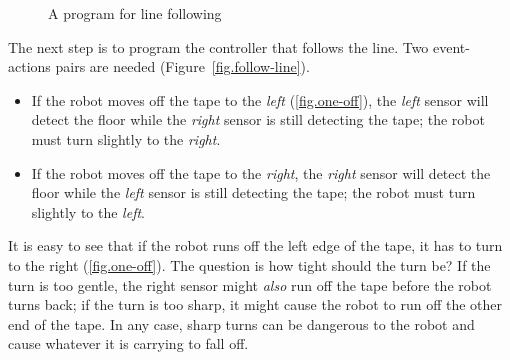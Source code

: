 \begin{figure}
\hfill
{}
\caption{A program for line following}\label{fig.follow-line-all}
\end{figure}




The next step is to program the controller that follows the line. Two
event-actions pairs are needed (Figure~\cref{fig.follow-line}).

\begin{itemize}

\item If the robot moves off the tape to the \emph{left}
(\cref{fig.one-off}), the \emph{left} sensor will detect the floor while
the \emph{right} sensor is still detecting the tape; the robot must
turn slightly to the \emph{right}.

\item If the robot moves off the tape to the \emph{right}, the
\emph{right} sensor will detect the floor while the \emph{left} sensor
is still detecting the tape; the robot must turn slightly
to the \emph{left}.

\end{itemize}



It is easy to see that if the robot runs off the left edge of the tape,
it has to turn to the right (\cref{fig.one-off}). The question is
how tight should the turn be? If the turn is too gentle, the right
sensor might \emph{also} run off the tape before the robot turns back;
if the turn is too sharp, it might cause the robot to run off the
other end of the tape. In any case, sharp turns can be dangerous to
the robot and cause whatever it is carrying to fall off.

